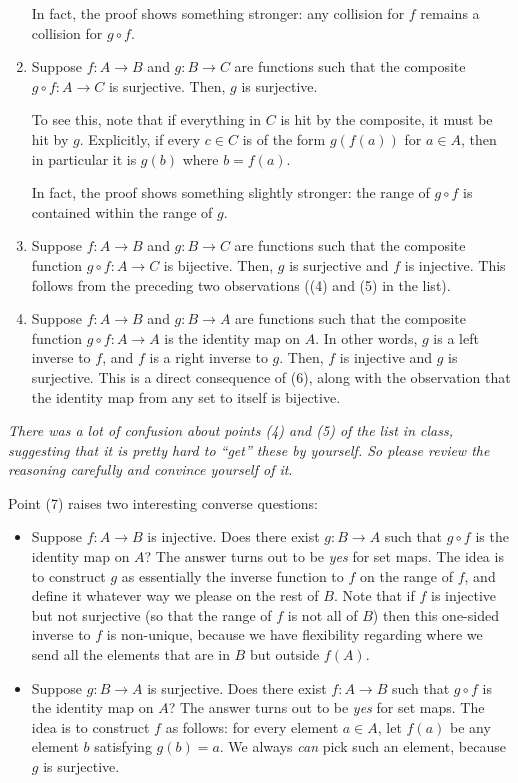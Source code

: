 \documentclass[10pt]{amsart}
\begin{document}
\begin{enumerate}
  In fact, the proof shows something stronger: any collision for $f$
  remains a collision for $g \circ f$.
\item Suppose $f:A \to B$ and $g:B \to C$ are functions such that the
  composite $g \circ f:A \to C$ is surjective. Then, $g$ is
  surjective. 

  To see this, note that if everything in $C$ is hit by the composite,
  it must be hit by $g$. Explicitly, if every $c \in C$ is of the form
  $g(f(a))$ for $a \in A$, then in particular it is $g(b)$ where $b =
  f(a)$.

  In fact, the proof shows something slightly stronger: the range of
  $g \circ f$ is contained within the range of $g$.
\item Suppose $f:A \to B$ and $g:B \to C$ are functions such that the
  composite function $g \circ f:A \to C$ is bijective. Then, $g$ is surjective
  and $f$ is injective. This follows from the preceding two
  observations ((4) and (5) in the list).

\item Suppose $f:A \to B$ and $g:B \to A$ are functions such that the
  composite function $g \circ f: A \to A$ is the identity map on
  $A$. In other words, $g$ is a left inverse to $f$, and $f$ is a
  right inverse to $g$. Then, $f$ is injective and $g$ is
  surjective. This is a direct consequence of (6), along with the
  observation that the identity map from any set to itself is
  bijective.
\end{enumerate}

{\em There was a lot of confusion about points (4) and (5) of the list
  in class, suggesting that it is pretty hard to ``get'' these by
  yourself. So please review the reasoning carefully and convince
  yourself of it}.

Point (7) raises two interesting converse questions: 

\begin{itemize}
\item Suppose $f: A \to B$ is injective. Does there exist $g: B \to A$
  such that $g \circ f$ is the identity map on $A$? The answer turns
  out to be {\em yes} for set maps. The idea is to construct $g$ as
  essentially the inverse function to $f$ on the range of $f$, and
  define it whatever way we please on the rest of $B$. Note that if
  $f$ is injective but not surjective (so that the range of $f$ is not
  all of $B$) then this one-sided inverse to $f$ is non-unique,
  because we have flexibility regarding where we send all the elements
  that are in $B$ but outside $f(A)$.
\item Suppose $g:B \to A$ is surjective. Does there exist $f:A \to B$
  such that $g \circ f$ is the identity map on $A$? The answer turns
  out to be {\em yes} for set maps. The idea is to construct $f$ as
  follows: for every element $a \in A$, let $f(a)$ be any element $b$
  satisfying $g(b) = a$. We always {\em can} pick such an element,
  because $g$ is surjective.
\end{itemize}
\end{document}
